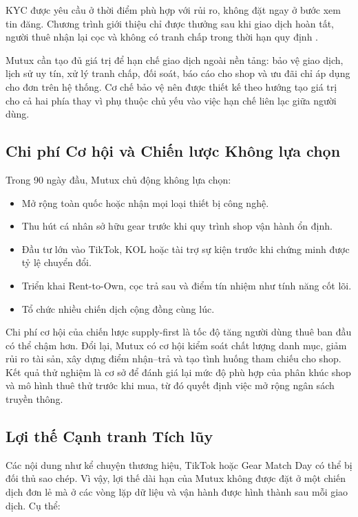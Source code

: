 KYC được yêu cầu ở thời điểm phù hợp với rủi ro, không đặt ngay ở bước xem tin đăng. Chương trình giới thiệu chỉ được thưởng sau khi giao dịch hoàn tất, người thuê nhận lại cọc và không có tranh chấp trong thời hạn quy định \cite{godesMayzlin2009,ryuFeick2007referral}.

Mutux cần tạo đủ giá trị để hạn chế giao dịch ngoài nền tảng: bảo vệ giao dịch, lịch sử uy tín, xử lý tranh chấp, đối soát, báo cáo cho shop và ưu đãi chỉ áp dụng cho đơn trên hệ thống. Cơ chế bảo vệ nên được thiết kế theo hướng tạo giá trị cho cả hai phía thay vì phụ thuộc chủ yếu vào việc hạn chế liên lạc giữa người dùng.

\subsection{Chi phí Cơ hội và Chiến lược Không lựa chọn}

Trong 90 ngày đầu, Mutux chủ động không lựa chọn:

\begin{itemize}
    \item Mở rộng toàn quốc hoặc nhận mọi loại thiết bị công nghệ.
    \item Thu hút cá nhân sở hữu gear trước khi quy trình shop vận hành ổn định.
    \item Đầu tư lớn vào TikTok, KOL hoặc tài trợ sự kiện trước khi chứng minh được tỷ lệ chuyển đổi.
    \item Triển khai Rent-to-Own, cọc trả sau và điểm tín nhiệm như tính năng cốt lõi.
    \item Tổ chức nhiều chiến dịch cộng đồng cùng lúc.
\end{itemize}

Chi phí cơ hội của chiến lược supply-first là tốc độ tăng người dùng thuê ban đầu có thể chậm hơn. Đổi lại, Mutux có cơ hội kiểm soát chất lượng danh mục, giảm rủi ro tài sản, xây dựng điểm nhận--trả và tạo tình huống tham chiếu cho shop. Kết quả thử nghiệm là cơ sở để đánh giá lại mức độ phù hợp của phân khúc shop và mô hình thuê thử trước khi mua, từ đó quyết định việc mở rộng ngân sách truyền thông.

\subsection{Lợi thế Cạnh tranh Tích lũy}

Các nội dung như kể chuyện thương hiệu, TikTok hoặc Gear Match Day có thể bị đối thủ sao chép. Vì vậy, lợi thế dài hạn của Mutux không được đặt ở một chiến dịch đơn lẻ mà ở các vòng lặp dữ liệu và vận hành được hình thành sau mỗi giao dịch. Cụ thể:

